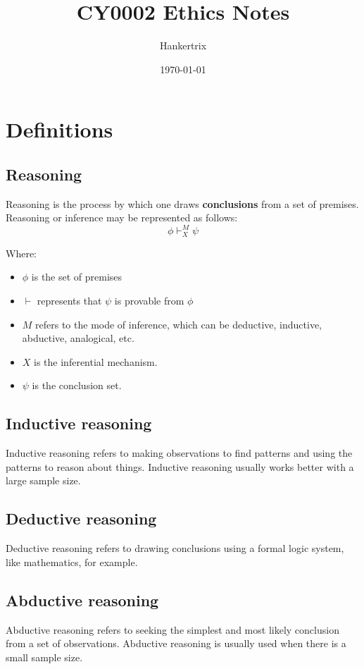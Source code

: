 \documentclass[11pt]{article}
\author{Hankertrix}
\date{\today}
\title{CY0002 Ethics Notes}
\begin{document}
\maketitle
\setcounter{tocdepth}{2}
\tableofcontents \clearpage\section{Definitions}
\label{sec:org638167e}

\subsection{Reasoning}
\label{sec:org1fa3016}
Reasoning is the process by which one draws \textbf{conclusions} from a set of premises. Reasoning or inference may be represented as follows:
\[\phi \vdash^M_X \psi\]

Where:
\begin{itemize}
\item \(\phi\) is the set of premises
\item \(\vdash\) represents that \(\psi\) is provable from \(\phi\)
\item \(M\) refers to the mode of inference, which can be deductive, inductive, abductive, analogical, etc.
\item \(X\) is the inferential mechanism.
\item \(\psi\) is the conclusion set.
\end{itemize}
\subsection{Inductive reasoning}
\label{sec:org111aa49}
Inductive reasoning refers to making observations to find patterns and using the patterns to reason about things. Inductive reasoning usually works better with a large sample size.
\subsection{Deductive reasoning}
\label{sec:orge3ec7c1}
Deductive reasoning refers to drawing conclusions using a formal logic system, like mathematics, for example.
\subsection{Abductive reasoning}
\label{sec:org594a5e9}
Abductive reasoning refers to seeking the simplest and most likely conclusion from a set of observations. Abductive reasoning is usually used when there is a small sample size.
\end{document}
